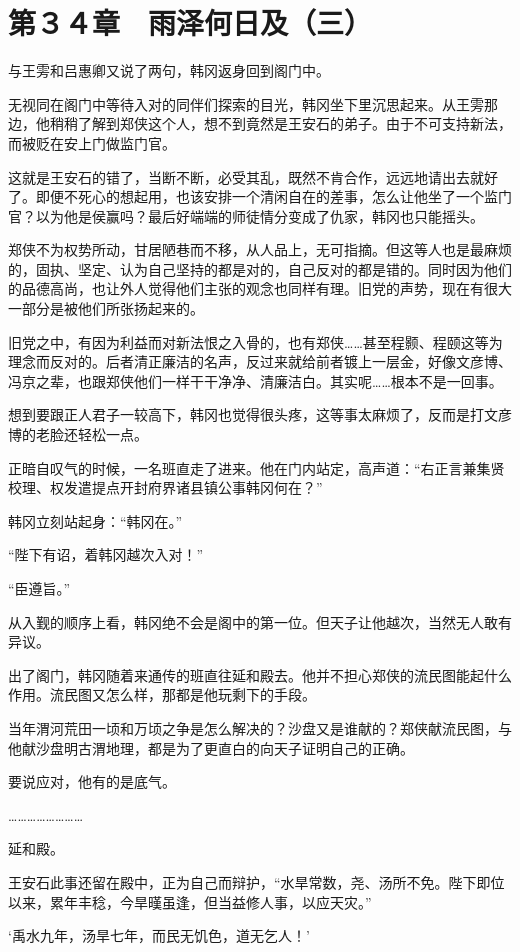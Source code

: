 \section{第３４章　雨泽何日及（三）}

与王雱和吕惠卿又说了两句，韩冈返身回到阁门中。

无视同在阁门中等待入对的同伴们探索的目光，韩冈坐下里沉思起来。从王雱那边，他稍稍了解到郑侠这个人，想不到竟然是王安石的弟子。由于不可支持新法，而被贬在安上门做监门官。

这就是王安石的错了，当断不断，必受其乱，既然不肯合作，远远地请出去就好了。即便不死心的想起用，也该安排一个清闲自在的差事，怎么让他坐了一个监门官？以为他是侯赢吗？最后好端端的师徒情分变成了仇家，韩冈也只能摇头。

郑侠不为权势所动，甘居陋巷而不移，从人品上，无可指摘。但这等人也是最麻烦的，固执、坚定、认为自己坚持的都是对的，自己反对的都是错的。同时因为他们的品德高尚，也让外人觉得他们主张的观念也同样有理。旧党的声势，现在有很大一部分是被他们所张扬起来的。

旧党之中，有因为利益而对新法恨之入骨的，也有郑侠……甚至程颢、程颐这等为理念而反对的。后者清正廉洁的名声，反过来就给前者镀上一层金，好像文彦博、冯京之辈，也跟郑侠他们一样干干净净、清廉洁白。其实呢……根本不是一回事。

想到要跟正人君子一较高下，韩冈也觉得很头疼，这等事太麻烦了，反而是打文彦博的老脸还轻松一点。

正暗自叹气的时候，一名班直走了进来。他在门内站定，高声道：“右正言兼集贤校理、权发遣提点开封府界诸县镇公事韩冈何在？”

韩冈立刻站起身：“韩冈在。”

“陛下有诏，着韩冈越次入对！”

“臣遵旨。”

从入觐的顺序上看，韩冈绝不会是阁中的第一位。但天子让他越次，当然无人敢有异议。

出了阁门，韩冈随着来通传的班直往延和殿去。他并不担心郑侠的流民图能起什么作用。流民图又怎么样，那都是他玩剩下的手段。

当年渭河荒田一顷和万顷之争是怎么解决的？沙盘又是谁献的？郑侠献流民图，与他献沙盘明古渭地理，都是为了更直白的向天子证明自己的正确。

要说应对，他有的是底气。

……………………

延和殿。

王安石此事还留在殿中，正为自己而辩护，“水旱常数，尧、汤所不免。陛下即位以来，累年丰稔，今旱暵虽逢，但当益修人事，以应天灾。”

‘禹水九年，汤旱七年，而民无饥色，道无乞人！’

